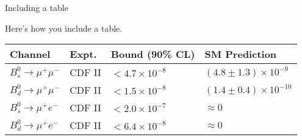 \begin{frame}[c]{Including a table}
	
	Here's how you include a table.
	\vspace{1em}
	
	\footnotesize	
		\begin{tabular}{llll}\hline 
		\textbf{Channel} & \textbf{Expt.} & \textbf{Bound (90\% CL)} & \textbf{SM Prediction} \\ \hline
		\textcolor{FlipGreen}{$B^0_s \to \mu^+ \mu^-$} & \textcolor{FlipGreen}{CDF II}
		                  & \textcolor{FlipGreen}{$<4.7\times 10^{-8}$}
		                  & \textcolor{FlipGreen}{$(4.8\pm 1.3) \times 10^{-9}$} \\ 
		$B^0_d \to \mu^+ \mu^-$ & CDF II
		                  & $<1.5\times 10^{-8}$
		                  & $(1.4\pm 0.4) \times 10^{-10}$  \\ 
		\hline
		$B^0_s \to \mu^+ e^-$ & CDF II
		                  & $<2.0\times 10^{-7}$
		                  & $\approx 0$ \\ 
		$B^0_d \to \mu^+ e^-$ & CDF II
		                  & $<6.4 \times 10^{-8}$
		                  & $\approx 0$ \\
		\hline 
		\end{tabular}
		\vspace{1em}
		
		\normalsize
\end{frame}


